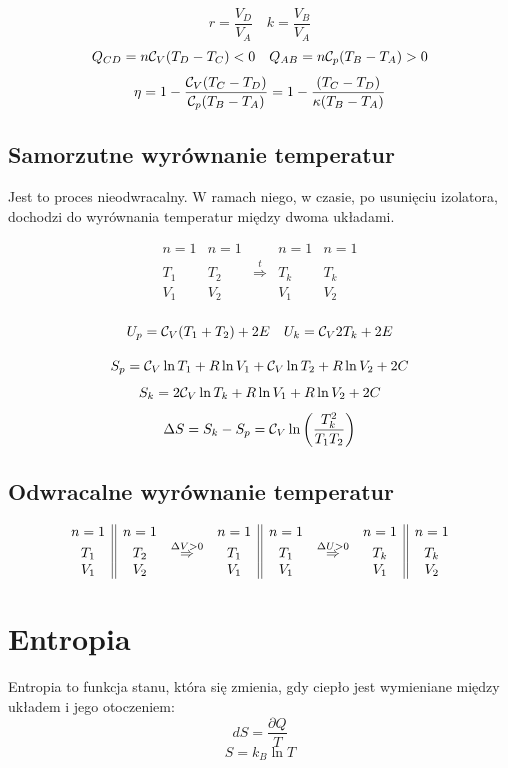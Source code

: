 \documentclass{../notatki}
\begin{document}
$$
r = \frac{V_D}{V_A} \quad k = \frac{V_B}{V_A}
$$
$$
Q_{CD} = n\mathcal{C}_V(T_D - T_C) < 0 \quad Q_{AB} = n\mathcal{C}_p (T_B - T_A) > 0
$$
$$
\eta = 1 - \frac{\mathcal{C}_V(T_C - T_D)}{\mathcal{C}_p (T_B - T_A)} = 1 -
\frac{(T_C - T_D)}{\kappa (T_B - T_A)}
$$

\subsection{Samorzutne wyrównanie temperatur}

Jest to proces nieodwracalny. W ramach niego, w czasie, po usunięciu
izolatora, dochodzi do wyrównania
temperatur między dwoma układami.

$$
\begin{array}{c||ccc|c}
  n = 1 & n = 1 & & n = 1 & n = 1 \\
  T_1 & T_2 & \stackrel{t}{\Rightarrow} & T_k & T_k \\
  V_1 & V_2 &  & V_1 & V_2 \\
\end{array}
$$

$$
U_p = \mathcal{C}_V(T_1 + T_2) + 2E \quad U_k = \mathcal{C}_V 2T_k + 2E
$$

$$
S_p = \mathcal{C}_V \ln T_1 + R\ln V_1 + \mathcal{C}_V \ln T_2 + R \ln V_2 + 2C
$$
$$
S_k = 2\mathcal{C}_V \ln T_k + R \ln V_1 + R \ln V_2 + 2C
$$
$$
\Delta S = S_k - S_p = \mathcal{C}_V \ln \left(\frac{T_k^2}{T_1 T_2}\right)
$$

\subsection{Odwracalne wyrównanie temperatur}

$$
\begin{array}{c||c c c||c c c||c}
  n = 1 & n = 1 & & n = 1 & n = 1 & & n =1 & n = 1  \\
  T_1 & T_2 & \stackrel{\Delta V > 0}{\Rightarrow} & T_1 & T_1 &
  \stackrel{\Delta U > 0}{\Rightarrow} & T_k & T_k \\
  V_1 & V_2 &  & V_1 & V_1 & & V_1 & V_2 \\
\end{array}
$$

\section{Entropia}

Entropia to funkcja stanu, która się zmienia, gdy ciepło jest
wymieniane między układem i jego otoczeniem:
$$
dS = \frac{\partial Q}{T}
$$
$$
S = k_B \ln T
$$
\end{document}
